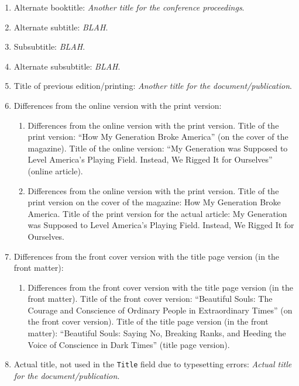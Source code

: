 \documentclass[letter,12pt]{article}
\begin{document}
\begin{enumerate}
\begin{enumerate}
\begin{enumerate}
		\item Alternate booktitle: {\it Another title for the conference proceedings}.
		\item Alternate subtitle: {\it BLAH}.
		\item Subsubtitle: {\it BLAH}.
		\item Alternate subsubtitle: {\it BLAH}.
		\item Title of previous edition/printing: {\it Another title for the document/publication}.
		\item Differences from the online version with the print version: \vspace{-0.1cm}
			\begin{enumerate} \itemsep -1pt
			\item Differences from the online version with the print version. Title of the print version: ``How My Generation Broke America'' (on the cover of the magazine). Title of the online version: ``My Generation was Supposed to Level America's Playing Field. Instead, We Rigged It for Ourselves'' (online article).
			\item Differences from the online version with the print version. Title of the print version on the cover of the magazine: How My Generation Broke America. Title of the print version for the actual article: My Generation was Supposed to Level America's Playing Field. Instead, We Rigged It for Ourselves.
			\end{enumerate}
		\item Differences from the front cover version with the title page version (in the front matter): \vspace{-0.1cm}
			\begin{enumerate} \itemsep -1pt
			\item Differences from the front cover version with the title page version (in the front matter). Title of the front cover version: ``Beautiful Souls: The Courage and Conscience of Ordinary People in Extraordinary Times'' (on the front cover version). Title of the title page version (in the front matter): ``Beautiful Souls: Saying No, Breaking Ranks, and Heeding the Voice of Conscience in Dark Times'' (title page version).
			\end{enumerate}
		\item Actual title, not used in the {\tt Title} field due to typesetting errors: {\it Actual title for the document/publication}.
		\end{enumerate}

\end{enumerate}
\end{enumerate}
\end{document}
